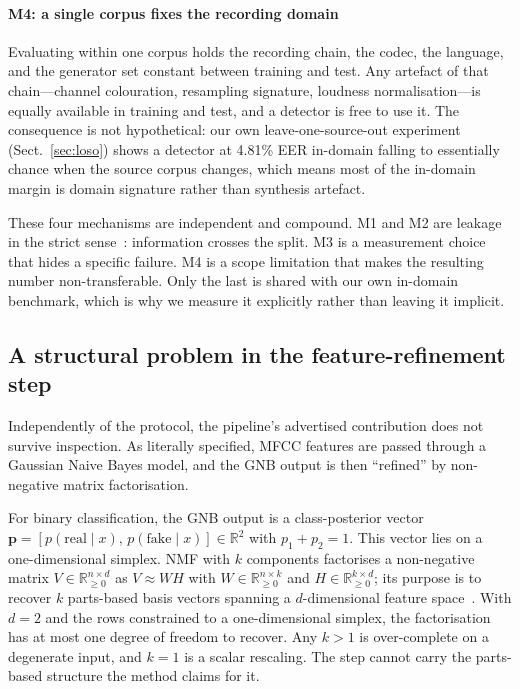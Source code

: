 \documentclass[sn-mathphys-num,pdflatex]{sn-jnl}
\begin{document}
\paragraph{M4: a single corpus fixes the recording domain}
Evaluating within one corpus holds the recording chain, the codec, the language,
and the generator set constant between training and test. Any artefact of that
chain---channel colouration, resampling signature, loudness normalisation---is
equally available in training and test, and a detector is free to use it. The
consequence is not hypothetical: our own leave-one-source-out experiment
(Sect.~\ref{sec:loso}) shows a detector at 4.81\% EER in-domain falling to
essentially chance when the source corpus changes, which means most of the
in-domain margin is domain signature rather than synthesis artefact.

These four mechanisms are independent and compound. M1 and M2 are leakage in the
strict sense~\cite{leakage}: information crosses the split. M3 is a measurement
choice that hides a specific failure. M4 is a scope limitation that makes the
resulting number non-transferable. Only the last is shared with our own
in-domain benchmark, which is why we measure it explicitly rather than leaving
it implicit.

\subsection{A structural problem in the feature-refinement step}\label{sec:degenerate}

Independently of the protocol, the pipeline's advertised contribution does not
survive inspection. As literally specified, MFCC features are passed through a
Gaussian Naive Bayes model, and the GNB output is then ``refined'' by
non-negative matrix factorisation.

For binary classification, the GNB output is a class-posterior vector
$\mathbf{p} = [p(\text{real}\mid x),\, p(\text{fake}\mid x)] \in \mathbb{R}^2$
with $p_1 + p_2 = 1$. This vector lies on a one-dimensional simplex. NMF with
$k$ components factorises a non-negative matrix
$V \in \mathbb{R}^{n \times d}_{\ge 0}$ as $V \approx WH$ with
$W \in \mathbb{R}^{n \times k}_{\ge 0}$ and
$H \in \mathbb{R}^{k \times d}_{\ge 0}$; its purpose is to recover $k$
parts-based basis vectors spanning a $d$-dimensional feature
space~\cite{nmf}. With $d = 2$ and the rows constrained to a
one-dimensional simplex, the factorisation has at most one degree of freedom to
recover. Any $k > 1$ is over-complete on a degenerate input, and $k = 1$ is a
scalar rescaling. The step cannot carry the parts-based structure the method
claims for it.
\end{document}
